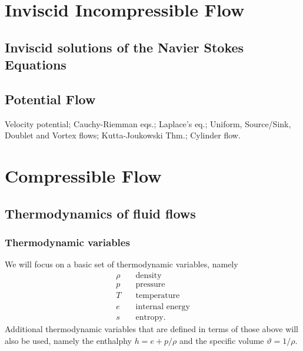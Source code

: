 \documentclass[oneside,a4paper,11pt]{report}
\begin{document}
\part{Inviscid Incompressible Flow}

\chapter{Inviscid solutions of the Navier Stokes Equations}

\chapter{Potential Flow}
Velocity potential; Cauchy-Riemman eqs.; Laplace's eq.; Uniform, Source/Sink, Doublet and Vortex flows; Kutta-Joukowski Thm.; Cylinder flow.

\part{Compressible Flow}
\chapter{Thermodynamics of fluid flows}

\section{Thermodynamic variables}
We will focus on a basic set of thermodynamic variables, namely 
\begin{align}
    \rho & \quad \text{density} \nonumber \\
    p & \quad \text{pressure} \nonumber \\
    T & \quad \text{temperature} \nonumber \\
    e & \quad \text{internal energy} \nonumber \\
    s & \quad \text{entropy}. \nonumber
\end{align}
Additional thermodynamic variables that are defined in terms of those above will also be used, namely the enthalphy $h = e + p/\rho$ and the specific volume $\vartheta = 1/\rho$.
\end{document}
